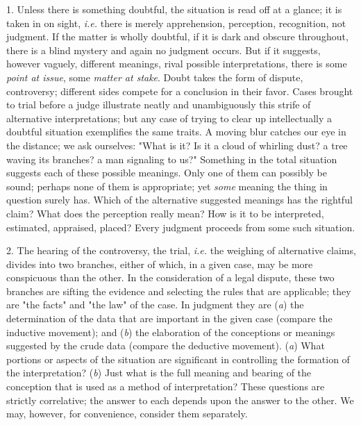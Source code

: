 \documentclass[showtrims,ustradepaper]{memoir}
\begin{document}
1. Unless there is something doubtful, the situation is read off at a
glance; it is taken in on sight, \emph{i.e.} there is merely
apprehension, perception, recognition, not judgment. If the matter is
wholly doubtful, if it is dark and obscure throughout, there is a blind
mystery and again no judgment occurs. But if it suggests, however
vaguely, different meanings, rival possible interpretations, there is
some \emph{point at issue}, some \emph{matter at stake}. Doubt takes the
form of dispute, controversy; different sides compete for a conclusion
in their favor. Cases brought to trial before a judge illustrate neatly
and unambiguously this strife of alternative interpretations; but any
case of trying to clear up intellectually a doubtful situation
exemplifies the same traits. A moving blur catches our eye in the
distance; we ask ourselves: "What is it? Is it a cloud of whirling dust?
a tree waving its branches? a man signaling to us?" Something in the
total situation suggests each of these possible meanings. Only one of
them can possibly be sound; perhaps none of them is appropriate; yet
\emph{some} meaning the thing in question surely has. Which of the
alternative suggested meanings has the rightful claim? What does the
perception really mean? How is it to be interpreted, estimated,
appraised, placed? Every judgment proceeds from some such situation.


2. The hearing of the controversy, the trial, \emph{i.e.} the weighing
of alternative claims, divides into two branches, either of which, in a
given case, may be more conspicuous than the other. In the consideration
of a legal dispute, these two branches are sifting the evidence
and
selecting the rules that are applicable; they are "the facts" and "the
law" of the case. In judgment they are (\emph{a}) the determination of
the data that are important in the given case (compare the inductive
movement); and (\emph{b}) the elaboration of the conceptions or meanings
suggested by the crude data (compare the deductive movement). (\emph{a})
What portions or aspects of the situation are significant in controlling
the formation of the interpretation? (\emph{b}) Just what is the full
meaning and bearing of the conception that is used as a method of
interpretation? These questions are strictly correlative; the answer to
each depends upon the answer to the other. We may, however, for
convenience, consider them separately.

\end{document}
